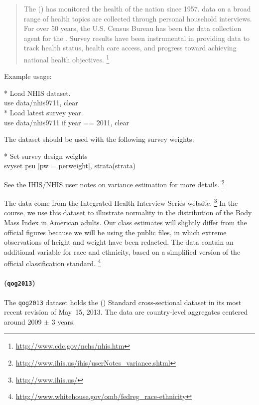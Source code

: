 \begin{quote}
	The \nhis (\NHIS) has monitored the health of the nation since 1957. \NHIS data on a broad range of health topics are collected through personal household interviews. For over 50 years, the U.S. Census Bureau has been the data collection agent for the \NHIS. Survey results have been instrumental in providing data to track health status, health care access, and progress toward achieving national health objectives.%
	\footnote{\url{http://www.cdc.gov/nchs/nhis.htm}} 
\end{quote}

Example usage:

\begin{docspec}
  * Load NHIS dataset.\\%
  use data/nhis9711, clear\\[1em]%
  * Load latest survey year.\\%
	use data/nhis9711 if year == 2011, clear
\end{docspec}

The \NHIS dataset should be used with the following survey weights:

\begin{docspec}
    * Set survey design weights\\
    svyset psu [pw = perweight], strata(strata)
\end{docspec}

See the IHIS/NHIS user notes on variance estimation for more details.%
  \footnote{\url{http://www.ihis.us/ihis/userNotes_variance.shtml}}

The data come from the Integrated Health Interview Series website.%
  \footnote{\url{http://www.ihis.us/}} %
  In the course, we use this dataset to illustrate normality in the distribution of the Body Mass Index in American adults. Our class estimates will slightly differ from the official figures because we will be using the public \nhis files, in which extreme observations of height and weight have been redacted. The data contain an additional variable for race and ethnicity, based on a simplified version of the official classification standard.%
  \footnote{\url{http://www.whitehouse.gov/omb/fedreg_race-ethnicity}}%

\paragraph{\qog (\texttt{qog2013})}

The \texttt{qog2013} dataset holds the \qog (\QOG) Standard cross-sectional dataset in its most recent revision of May~15, 2013. The data are country-level aggregates centered around 2009 $\pm$ 3 years.%

